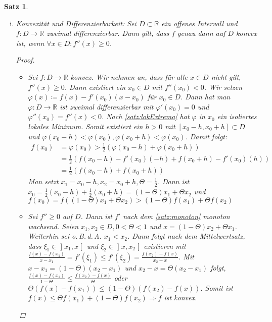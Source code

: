 \documentclass[ngerman,titlepage,twoside, parskip=half*]{scrreprt}
\newcommand*{\R}{\mathbb{R}}
\theoremstyle{break}
\newtheorem{theorem}{Satz}[section]
\theoremstyle{nonumberbreak}
\newtheorem{proof}{Beweis:}
\newcommand*{\bsofint}[1]{\mathopen{]}#1\mathclose{[}} %
\begin{document}
\begin{theorem}
\begin{enumerate}[(i)]
  \item \emph{Konvexität und Differenzierbarkeit}: 
    Sei $D\subset\R$ ein offenes Intervall und $f\colon D\rightarrow\R$
    zweimal differenzierbar. Dann gilt, dass $f$ genau dann auf $D$
    konvex ist, wenn $\forall x\in D\colon f''(x)\geq 0$.
    \begin{proof}
      \begin{itemize}
      \item["`$\Rightarrow$"'] Sei $f\colon D\rightarrow\R$
        konvex. Wir nehmen an, dass für alle $x\in D$ \emph{nicht}
        gilt, $f''(x)\geq0$. Dann existiert ein $x_{0}\in D$ mit
        $f''(x_{0})< 0$. Wir setzen $\varphi(x)\coloneqq
        f(x)-f'(x_0)(x-x_0)$ für $x_0\in D$. Dann hat man
        $\varphi\colon D\rightarrow\R$ ist zweimal differenzierbar mit
        $\varphi'(x_0)=0$ und $\varphi''(x_0)=f''(x)<0$. Nach
        \autoref{satz:lokExtrema} hat $\varphi$ in $x_0$ ein
        isoliertes lokales Minimum. Somit existiert ein $h>0$ mit
        $[x_0-h, x_0+h]\subset D$ und $\varphi(x_0-h)<\varphi(x_0),
        \varphi(x_0+h)<\varphi(x_0)$. Damit folgt:
        \begin{align*}
          f(x_0) &= \varphi(x_0) > \frac{1}{2}(\varphi(x_0-h)+\varphi(x_0+h))\\
          &= \frac{1}{2}(f(x_0-h)-f'(x_0)(-h)+f(x_0+h)-f'(x_0)(h))\\
          &=\frac{1}{2}(f(x_0-h)+f(x_0+h))
        \end{align*}
        Man setzt $x_1=x_0-h, x_2=x_0+h, \Theta=\frac{1}{2}$. Dann ist
        $x_0=\frac{1}{2}(x_0-h)+\frac{1}{2}(x_0+h)=(1-\Theta)x_1+
        \Theta x_2$ und $f(x_0)=f( (1-\Theta)x_1+\Theta
        x_2)>(1-\Theta) f(x_1)+\Theta f(x_2)$\lightning
      \item["`$\Leftarrow$"'] Sei $f''\geq 0$ auf $D$. Dann ist $f'$
        nach dem \autoref{satz:monoton} monoton wachsend. Seien
        $x_1,x_2\in D, 0<\Theta<1$ und $x=(1-\Theta)x_2+\Theta
        x_1$. Weiterhin sei o.\,B.\,d.\,A. $x_1<x_2$. Dann folgt nach
        dem Mittelwertsatz, dass $\xi_1\in\bsofint{x_1,x}$ und
        $\xi_2\in\bsofint{x,x_2}$ existieren mit
        $\frac{f(x)-f(x_1)}{x-x_1} =f'(\xi_1)\leq f'(\xi_2)=
        \frac{f(x_2)-f(x)}{x_2-x}$. Mit $x-x_1= (1-\Theta)(x_2-x_1)$
        und $x_2-x=\Theta(x_2-x_1)$ folgt,
        $\frac{f(x)-f(x_1)}{1-\Theta} \leq\frac{f(x_2)-f(x)}{\Theta}$
        oder $\Theta(f(x)-f(x_1))\leq (1-\Theta)(f(x_2)-f(x))$. Somit
        ist $f(x)\leq \Theta f(x_1)+ (1-\Theta)f(x_2)\Rightarrow f$
        ist konvex.
      \end{itemize}
    \end{proof}
  \end{enumerate}
\end{theorem}
\end{document}
